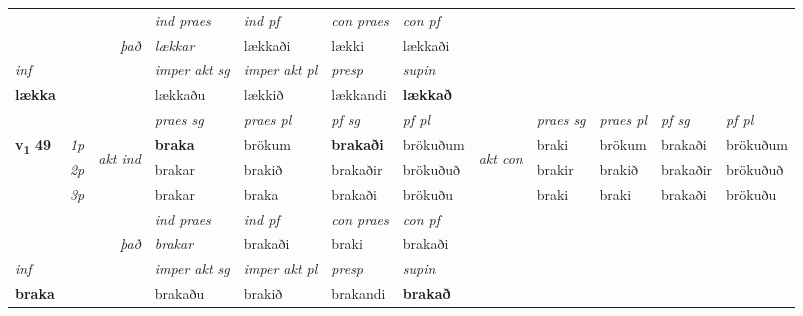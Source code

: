 \begin{longtable}[l]{X>{\footnotesize\itshape}llXXXXlXXXX}
   && &  \textit{ind praes} & \textit{ind pf} & \textit{con praes} & \textit{con pf} \\*
\multicolumn{3}{r}{\textit{það}} & lækkar & lækkaði & lækki & lækkaði \\*

\cmidrule{4-7}
   {\textit{inf}} & &  & \textit{imper akt sg} & \textit{imper akt pl}   & \textit{presp} & \textit{supin}   \\*
  {\textbf{lækka}} & && lækkaðu  & lækkið   & lækkandi &  \textbf{lækkað}   \\*

\midrule

 & &   & \textit{praes sg}  & \textit{praes pl}    & \textit{ pf sg} & \textit{pf pl} & & \textit{praes sg}  & \textit{praes pl}    & \textit{pf sg} & \textit{pf pl }  \\ \cmidrule{4-7} \cmidrule{9-12}
 \multirow{2}{*}{{{\textbf{v{\textsubscript{1}}} \Large{\textbf{49}}}}}  & 1p & \multirow{3}{*}{\begin{turn}{90}\textit{akt ind}\end{turn}} & \textbf{braka} & brökum & \textbf{brakaði} & brökuðum & \multirow{3}{*}{\begin{turn}{90}\textit{akt con}\end{turn}} &braki & brökum & brakaði & brökuðum\\*
 & 2p &  &  brakar  & brakið & brakaðir & brökuðuð & & brakir & brakið & brakaðir & brökuðuð \\*
 & 3p &  & brakar & braka & brakaði & brökuðu & & braki & braki& brakaði & brökuðu \\*
\cmidrule{4-7} \cmidrule{9-12}

   && &  \textit{ind praes} & \textit{ind pf} & \textit{con praes} & \textit{con pf} \\*
\multicolumn{3}{r}{\textit{það}} & brakar & brakaði & braki & brakaði \\*

\cmidrule{4-7}
   {\textit{inf}} & &  & \textit{imper akt sg} & \textit{imper akt pl}   & \textit{presp} & \textit{supin}   \\*
  {\textbf{braka}} & && brakaðu  & brakið   & brakandi &  \textbf{brakað}   \\*

\midrule


\end{longtable}
